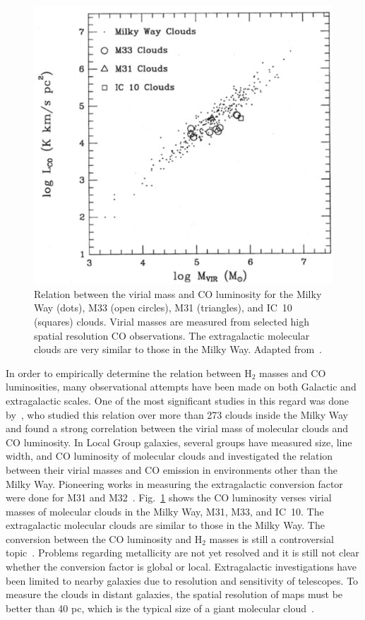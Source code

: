 \begin{figure}
\label{fig: mco}
\centering
\includegraphics[width=16cm]{../image_intro/mvirial_lco.pdf}
\caption{Relation between the virial mass and CO luminosity for the Milky Way (dots), M33 (open circles), M31 (triangles), and IC~10 (squares) clouds. Virial masses are measured from selected high spatial resolution CO observations. The extragalactic molecular clouds are very similar to those in the Milky Way. Adapted from~\cite{Young91}.}
\end{figure}

In order to empirically determine the relation between H$_2$ masses and CO luminosities, many observational attempts have been made on both Galactic and extragalactic scales. 
One of the most significant studies in this regard was done by~\cite{Solomon87}, who studied this relation over more than 273 clouds inside the Milky Way and found a strong correlation between the virial mass of molecular clouds and CO luminosity. 
In Local Group galaxies, several groups have measured size, line width, and CO luminosity of molecular clouds and investigated the relation between  their virial masses and CO emission in environments other than the Milky Way. 
Pioneering works in measuring the extragalactic conversion factor were done for M31 and M32~\citep[e.g.,][]{Wilson89, Wilson90}. 
Fig.~\ref{fig: mco} shows the CO luminosity verses virial masses of molecular clouds in the Milky Way, M31, M33, and IC~10. 
The extragalactic molecular clouds are similar to those in the Milky Way. 
The conversion between the CO luminosity and H$_2$ masses is still a controversial topic~\citep[e.g.][]{Narayanan11, Bolato13, Sandstrom13}.
Problems regarding metallicity are not yet resolved and it is still not clear whether the conversion factor is global or local. 
Extragalactic investigations have been limited to nearby galaxies due to resolution and sensitivity of telescopes. 
To measure the clouds in distant galaxies, the spatial resolution of maps must be better than 40 pc, which is the typical size of a giant molecular cloud~\citep[e.g.][and refrences therein]{Young91,Bolato13}. 


